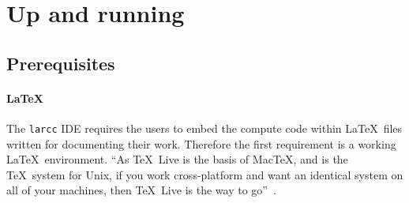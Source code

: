 \begin{abstract}
This document introduces the developer of geometric libreries and applications to  the integrated development environment (IDE)  set up for documentation and multilanguage development  using LAR-CC, the Linear Algebraic Representation for geometry, manufacturing and physics with \emph{Chains} and \emph{CoChains}. This IDE is strongly based on the \href{http://www.literateprogramming.com/}{literate programming} tool \emph{Nuweb}, aiming at embedding the code in the documentation, and not vice-versa.
The main goal of this framework is to facilitate how to express the \emph{why} of software design decisions, and not only the tricky details of low level coding.  I would recommend writing programs as if they were research papers and treat the code as you would write mathematical expressions in a research paper. Using multiple programming languages is allowed and even encouraged in \texttt{larcc}. When possible, the same functions coded in different languages should stay close within the same document subsection. The \texttt{larcc} IDE integrates a few programming, documentation and version control tools, including \href{http://www.tug.org/texlive/}{\LaTeX}, \href{http://sourceforge.net/projects/nuweb/}{\emph{Nuweb}}, \href{http://johnmacfarlane.net/pandoc/}{\emph{Pandoc}},  \href{http://git-scm.com/}{\emph{Git}}, and \href{http://leoeditor.com/}{Leo editor}.
\end{abstract}

\section{Up and running}

\subsection{Prerequisites}

\paragraph{\LaTeX}
The \texttt{larcc} IDE requires the users to embed the compute code within \LaTeX\ files written for documenting their work. Therefore the first requirement is a working \LaTeX\ environment. ``As \TeX\ Live is the basis of Mac\TeX, and is the \TeX\ system for Unix, if you work cross-platform and want an identical system on all of your machines, then \TeX\ Live is the way to go''~\cite{miktek:2012}.

